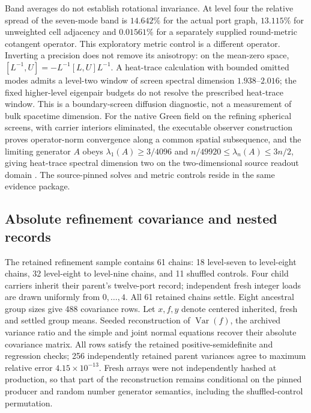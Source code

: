 Band averages do not establish rotational invariance. At level four the
relative spread of the seven-mode band is \(14.642\%\) for the actual
port graph, \(13.115\%\) for unweighted cell adjacency and \(0.01561\%\)
for a separately supplied round-metric cotangent operator. This exploratory
metric control is a different operator. Inverting a precision does not
remove its anisotropy: on the mean-zero space,
\([L^{-1},U]=-L^{-1}[L,U]L^{-1}\). A heat-trace calculation with bounded
omitted modes admits a level-two window of screen spectral dimension
\(1.938\)--\(2.016\); the fixed higher-level eigenpair budgets do not
resolve the prescribed heat-trace window. This is a boundary-screen
diffusion diagnostic, not a measurement of bulk spacetime dimension.
For the native Green field on the refining spherical screens, with carrier
interiors eliminated, the executable observer construction proves
operator-norm convergence along a common spatial subsequence, and the
limiting generator \(A\) obeys \(\lambda_1(A)\ge3/4096\) and
\(n/49920\le\lambda_n(A)\le3n/2\), giving heat-trace spectral dimension two
on the two-dimensional source readout domain \cite{ophmodel,ophcontinuum}.
The source-pinned solves and metric controls reside in the same evidence
package.

\subsection{Absolute refinement covariance and nested records}
\label{subsec:native-refinement-covariance}
The retained refinement sample contains 61 chains: 18 level-seven to
level-eight chains, 32 level-eight to level-nine chains, and 11 shuffled
controls. Four child carriers inherit their parent's twelve-port record;
independent fresh integer loads are drawn uniformly from \(0,\ldots,4\).
All 61 retained chains settle. Eight ancestral group sizes give 488
covariance rows. Let \(x,f,y\) denote centered inherited, fresh and
settled group means. Seeded reconstruction of \(\operatorname{Var}(f)\),
the archived variance ratio and the simple and joint normal equations
recover their absolute covariance matrix. All rows satisfy the retained
positive-semidefinite and regression checks; 256 independently retained
parent variances agree to maximum relative error \(4.15\times10^{-13}\).
Fresh arrays were not independently hashed at production, so that part of
the reconstruction remains conditional on the pinned producer and random
number generator semantics, including the shuffled-control permutation.

